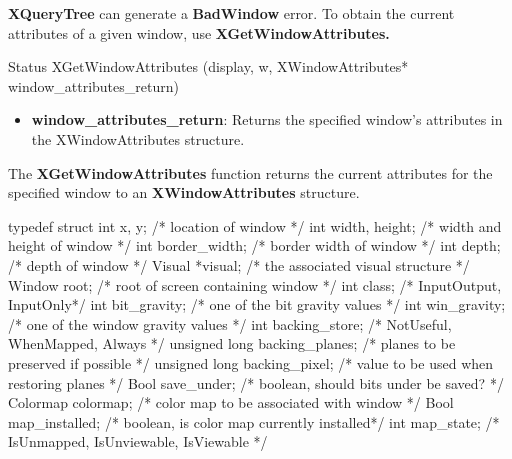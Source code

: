 \documentclass{report}
\begin{document}
\begin{itemize}
            \bigbreak \noindent 
            \textbf{XQueryTree} can generate a \textbf{BadWindow} error.
            \bigbreak \noindent 
            To obtain the current attributes of a given window, use \textbf{XGetWindowAttributes.}
            \bigbreak \noindent 
            \begin{cppcode}
                Status XGetWindowAttributes (display, w, XWindowAttributes* window_attributes_return)
            \end{cppcode}
            \bigbreak \noindent
            \begin{itemize}
                \item \textbf{window\_attributes\_return}: Returns the specified window’s attributes in the XWindowAttributes structure.
            \end{itemize}
            The \textbf{XGetWindowAttributes} function returns the current attributes for the specified window to an \textbf{XWindowAttributes} structure.
            \bigbreak \noindent 
            \begin{cppcode}
                typedef struct {
                    int x, y;                           /* location of window */
                    int width, height;                  /* width and height of window */
                    int border_width;                   /* border width of window */
                    int depth;                          /* depth of window */
                    Visual *visual;                     /* the associated visual structure */
                    Window root;                        /* root of screen containing window */
                    int class;                          /* InputOutput, InputOnly*/
                    int bit_gravity;                    /* one of the bit gravity values */
                    int win_gravity;                    /* one of the window gravity values */
                    int backing_store;                  /* NotUseful, WhenMapped, Always */
                    unsigned long backing_planes;       /* planes to be preserved if possible */
                    unsigned long backing_pixel;        /* value to be used when restoring planes */
                    Bool save_under;                    /* boolean, should bits under be saved? */
                    Colormap colormap;                  /* color map to be associated with window */
                    Bool map_installed;                 /* boolean, is color map currently installed*/
                    int map_state;                      /* IsUnmapped, IsUnviewable, IsViewable */
}
\end{cppcode}
\end{itemize}
\end{document}
